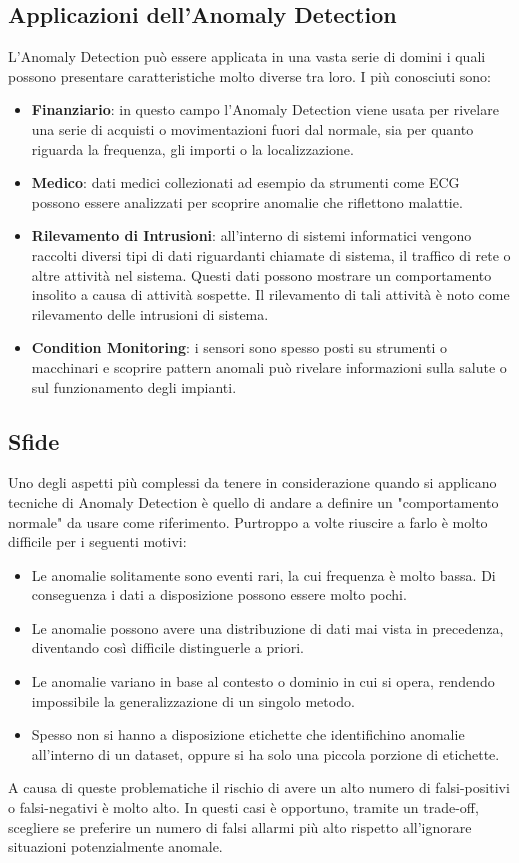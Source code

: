 \subsection{Applicazioni dell'Anomaly Detection}
L'Anomaly Detection può essere applicata in una vasta serie di domini i quali possono presentare caratteristiche molto diverse tra loro. I più conosciuti sono:
\begin{itemize}
	\item \textbf{Finanziario}: in questo campo l'Anomaly Detection viene usata per rivelare una serie di acquisti o movimentazioni fuori dal normale, sia per quanto riguarda la frequenza, gli importi o la localizzazione.
	\item \textbf{Medico}: dati medici collezionati ad esempio da strumenti come ECG possono essere analizzati per scoprire anomalie che riflettono malattie.
	\item \textbf{Rilevamento di Intrusioni}: all'interno di sistemi informatici vengono raccolti diversi tipi di dati riguardanti chiamate di sistema, il traffico di rete o altre attività nel sistema. Questi dati possono mostrare un comportamento insolito a causa di attività sospette. Il rilevamento di tali attività è noto come rilevamento delle intrusioni di sistema.
	\item \textbf{Condition Monitoring}: i sensori sono spesso posti su strumenti o macchinari e scoprire pattern anomali può rivelare informazioni sulla salute o sul funzionamento degli impianti.
\end{itemize}

\subsection{Sfide}
Uno degli aspetti più complessi da tenere in considerazione quando si applicano tecniche di Anomaly Detection è quello di andare a definire un "comportamento normale" da usare come riferimento. Purtroppo a volte riuscire a farlo è molto difficile per i seguenti motivi:
\begin{itemize}
	\item Le anomalie solitamente sono eventi rari, la cui frequenza è molto bassa. Di conseguenza i dati a disposizione possono essere molto pochi.
	\item Le anomalie possono avere una distribuzione di dati mai vista in precedenza, diventando così difficile distinguerle a priori.
	\item Le anomalie variano in base al contesto o dominio in cui si opera, rendendo impossibile la generalizzazione di un singolo metodo.
	\item Spesso non si hanno a disposizione etichette che identifichino anomalie all'interno di un dataset, oppure si ha solo una piccola porzione di etichette.
\end{itemize}
A causa di queste problematiche il rischio di avere un alto numero di falsi-positivi o falsi-negativi è molto alto. In questi casi è opportuno, tramite un trade-off, scegliere se preferire un numero di falsi allarmi più alto rispetto all'ignorare situazioni potenzialmente anomale.

